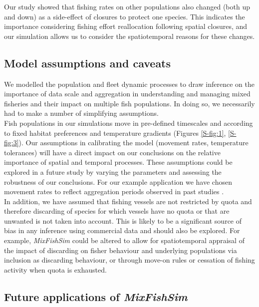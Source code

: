 \documentclass[review]{elsarticle}
\begin{document}
Our study showed that fishing rates on other populations also changed (both up
and down) as a side-effect of closures to protect one species.  This indicates
the importance  considering fishing effort reallocation following spatial
closures, and our simulation allows us to consider the spatiotemporal reasons
for these changes.

\subsection{Model assumptions and caveats}

We modelled the population and fleet dynamic processes to draw inference on the
importance of data scale and aggregation in understanding and managing mixed
fisheries and their impact on multiple fish populations. In doing so, we
necessarily had to make a number of simplifying assumptions. \\

Fish populations in our simulations move in pre-defined timescales and
according to fixed habitat preferences and temperature gradients (Figures
\ref{S-fig:1}, \ref{S-fig:3}). Our assumptions in calibrating the model
(movement rates, temperature tolerances) will have a direct impact on our
conclusions on the relative importance of spatial and temporal processes. These
assumptions could be explored in a future study by varying the parameters and
assessing the robustness of our conclusions. For our example application we
have chosen movement rates to reflect aggregation periods observed in past
studies \citep{Poos2007}. \\

In addition, we have assumed that fishing vessels are not restricted by quota
and therefore discarding of species for which vessels have no quota or that are
unwanted is not taken into account. This is likely to be a significant source
of bias in any inference using commercial data and should also be explored. For
example, \textit{MixFishSim} could be altered to allow for spatiotemporal
appraisal of the impact of discarding on fisher behaviour and underlying
populations via inclusion as discarding behaviour, or through move-on rules or
cessation of fishing activity when quota is exhausted. \\

\subsection{Future applications of \textit{MixFishSim}}
\end{document}
